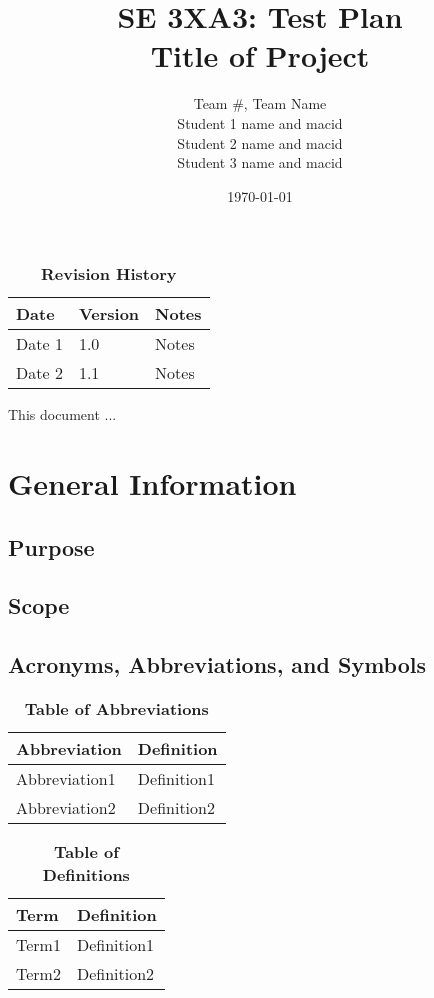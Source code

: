 \documentclass[12pt, titlepage]{article}
\title{SE 3XA3: Test Plan\\Title of Project}
\author{Team \#, Team Name
		\\ Student 1 name and macid
		\\ Student 2 name and macid
		\\ Student 3 name and macid
}
\date{\today}
\begin{document}
\maketitle
{}
\tableofcontents
\listoftables
\listoffigures
\begin{table}[bp]
\caption{\bf Revision History}
\begin{tabularx}{\textwidth}{p{3cm}p{2cm}X}
\toprule {\bf Date} & {\bf Version} & {\bf Notes}\\
\midrule
Date 1 & 1.0 & Notes\\
Date 2 & 1.1 & Notes\\
\bottomrule
\end{tabularx}
\end{table}
\newpage
{}
This document ...
\section{General Information}
\subsection{Purpose}
\subsection{Scope}
\subsection{Acronyms, Abbreviations, and Symbols}
	
\begin{table}[hbp]
\caption{\textbf{Table of Abbreviations}} \label{Table}
\begin{tabularx}{\textwidth}{p{3cm}X}
\toprule
\textbf{Abbreviation} & \textbf{Definition} \\
\midrule
Abbreviation1 & Definition1\\
Abbreviation2 & Definition2\\
\bottomrule
\end{tabularx}
\end{table}
\begin{table}[!htbp]
\caption{\textbf{Table of Definitions}} \label{Table}
\begin{tabularx}{\textwidth}{p{3cm}X}
\toprule
\textbf{Term} & \textbf{Definition}\\
\midrule
Term1 & Definition1\\
Term2 & Definition2\\
\bottomrule
\end{tabularx}
\end{table}	
\end{document}
